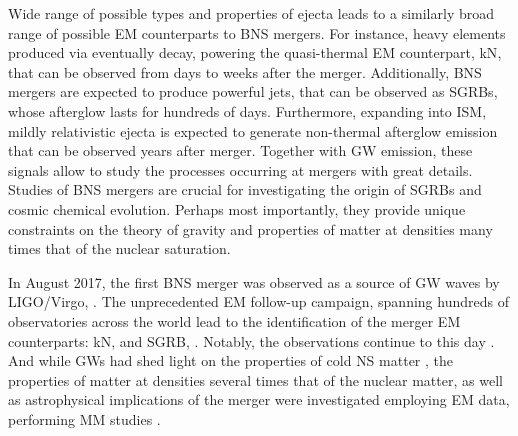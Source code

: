 Wide range of possible types and properties of ejecta leads to a similarly broad range of 
possible \ac{EM} counterparts to \ac{BNS} mergers. For instance, heavy elements 
produced via \rproc{} \nuc{} eventually decay, powering the quasi-thermal \ac{EM} 
counterpart, \ac{kN}, that can be observed from days to weeks after the merger. 
Additionally, \ac{BNS} mergers are expected to produce 
powerful jets, that can be observed as \acp{SGRB}, whose afterglow lasts for hundreds of days. 
Furthermore, expanding into \ac{ISM}, mildly relativistic ejecta is expected 
to generate non-thermal afterglow emission that can be observed years after merger. 
Together with \ac{GW} emission, these signals allow to study the processes occurring 
at mergers with great details. Studies of \ac{BNS} mergers are crucial for 
investigating the origin of \acp{SGRB} and cosmic chemical evolution. 
Perhaps most importantly, they provide unique constraints on the 
theory of gravity and properties of matter at densities 
many times that of the nuclear saturation. 



In August 2017, the first \ac{BNS} merger was observed 
as a source of \ac{GW} waves by \ac{LIGO}/Virgo, \GW{}. The unprecedented \ac{EM} 
follow-up campaign, spanning hundreds of observatories across the world lead to 
the identification of the merger \ac{EM} counterparts: \ac{kN}, \AT{} and 
\ac{SGRB}, \GRB{} 
\citep{TheLIGOScientific:2017qsa,Abbott:2018wiz,GBM:2017lvd}. 
Notably, the observations continue to this day \citep{Hajela:2021faz}.
%
And while \acp{GW} had shed light on the properties of cold \ac{NS} matter 
\citep{Hinderer:2009ca,Damour:2012yf,DelPozzo:2013ala}, 
the properties of matter at densities several times that of the 
nuclear matter, as well as astrophysical implications of the merger 
were investigated employing \ac{EM} data, performing \ac{MM} studies 
\citep{Villar:2017wcc,Hajela:2019mjy,Radice:2018ozg,LIGOScientific:2017ync}.

